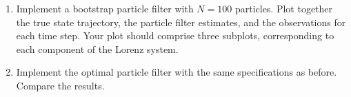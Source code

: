 \begin{enumerate}
\begin{enumerate}[label=\alph*)]
  \item Implement a bootstrap particle filter with $N = 100$ particles. Plot together the
    true state trajectory, the particle filter estimates, and the observations for each
    time step. Your plot should comprise three subplots, corresponding to each component
    of the Lorenz system.

  \item Implement the optimal particle filter with the same specifications as before.
    Compare the results.
\end{enumerate}

\end{enumerate}
